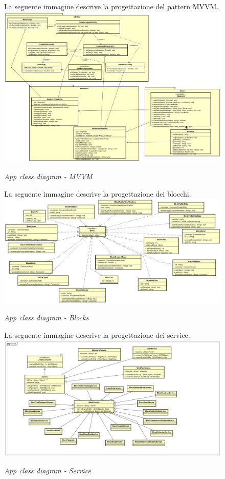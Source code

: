 \begin{figure} [H]
La seguente immagine descrive la progettazione del pattern MVVM.
	\centering
	\includegraphics[scale=0.27]{./images/MVVM.png}
	\caption{\textit{App class diagram - MVVM}}\label{MVVM}
\end{figure}


\begin{figure} [H]
La seguente immagine descrive la progettazione dei blocchi.
	\centering
	\includegraphics[scale=0.3]{./images/Blocks.png}
	\caption{\textit{App class diagram - Blocks}}\label{Blocks}
\end{figure}

\begin{figure} [H]
La seguente immagine descrive la progettazione dei service.
	\centering
	\includegraphics[scale=0.3]{./images/Service.png}
	\caption{\textit{App class diagram - Service}}\label{Service}
\end{figure}


